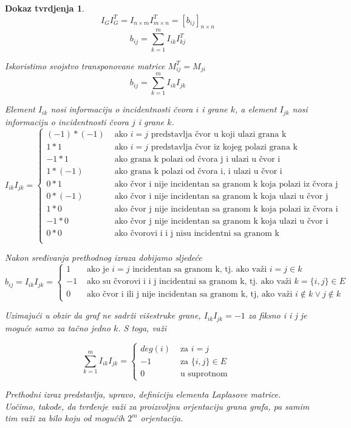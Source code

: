 \documentclass[11pt]{article}
\newtheorem*{custom_proof}{Dokaz tvrdjenja}
\begin{document}
			\begin{custom_proof}
			\[
				I_G I_G^T = I_{n \times m}  I^T_{m \times n}  = [b_{ij}]_{n \times n}
			\]
			\[
				 b_{ij} = \sum_{k=1}^{m} I_{ik} I_{kj}^T
			\]

			Iskoristimo svojstvo transponovane matrice $M_{ij}^T = M_{ji}$
			\[
				 b_{ij} = \sum_{k=1}^{m} I_{ik} I_{jk}
			\]

			Element $I_{ik}$ nosi informaciju o incidentnosti čvora $i$ i grane $k$, a element $I_{jk}$ nosi informaciju o incidentnosti čvora $j$ i grane $k$.
			\[
				 I_{ik}I_{jk} =
				 \begin{cases}
				 (-1) * (-1) & \text{ ako } i = j \text{ predstavlja čvor u koji ulazi grana k } \\
				 1 * 1 & \text{ ako } i = j \text{ predstavlja čvor iz kojeg polazi grana k } \\
				 -1 * 1 & \text{ ako grana k polazi od čvora j i ulazi u čvor i} \\
				 1 * (-1) & \text{ ako grana k polazi od čvora i, i ulazi u čvor i} \\
				 0 * 1 & \text{ ako čvor i nije incidentan sa granom k koja polazi iz čvora j } \\ 
				 0 * (-1) & \text{ ako čvor i nije incidentan sa granom k koja ulazi u čvor j } \\ 
				 1 * 0 & \text{ ako čvor j nije incidentan sa granom k koja polazi iz čvora i } \\ 
				 -1 * 0 & \text{ ako čvor j nije incidentan sa granom k koja ulazi u čvor i } \\ 
				 0 * 0 & \text{ ako čvorovi i i j nisu incidentni sa granom k } \\ 
				 \end{cases}
			\]

			Nakon sređivanja prethodnog izraza dobijamo sljedeće
			\[
				 b_{ij} = I_{ik}I_{jk} =
				 \begin{cases}
				 1 & \text{ ako je } i = j \text{ incidentan sa granom k, tj. ako važi }  i = j \in k \\
				 -1 & \text{ ako su čvorovi i i j incidentni sa granom k, tj. ako važi } k = \{i,j\} \in E \\
				 0 & \text{ ako čvor i ili j nije incidentan sa granom k, tj, ako važi } i \notin k \lor j \notin k 
				 \end{cases}
			\]

			Uzimajući u obzir da graf ne sadrži višestruke grane, $I_{ik}I_{jk} = -1$ za fiksno i i j je moguće samo za tačno jedno $k$. S toga, važi
			
			\[
				\sum_{k=1}^{m} I_{ik}I_{jk} =
				 \begin{cases}
				deg(i)  & \text{ za } i = j \\
				 -1  & \text{ za } \{i,j\} \in E \\
				 0 & \text{ u suprotnom }
				 \end{cases}
			 \]

			Prethodni izraz predstavlja, upravo, definiciju elementa Laplasove matrice. Uočimo, takođe, da tvrđenje važi za proizvoljnu orjentaciju grana grafa, pa samim tim važi za bilo koju
		    od mogućih $2^m$ orjentacija.
			\end{custom_proof}
	
\end{document}
